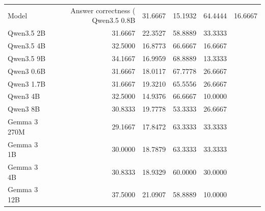 \begin{tabular}{lrrrr}
\toprule
Model & Answer correctness (%
\midrule
Qwen3.5 0.8B & 31.6667 & 15.1932 & 64.4444 & 16.6667 \\
Qwen3.5 2B & 31.6667 & 22.3527 & 58.8889 & 33.3333 \\
Qwen3.5 4B & 32.5000 & 16.8773 & 66.6667 & 16.6667 \\
Qwen3.5 9B & 34.1667 & 16.9959 & 68.8889 & 13.3333 \\
Qwen3 0.6B & 31.6667 & 18.0117 & 67.7778 & 26.6667 \\
Qwen3 1.7B & 31.6667 & 19.3210 & 65.5556 & 26.6667 \\
Qwen3 4B & 32.5000 & 14.9376 & 66.6667 & 10.0000 \\
Qwen3 8B & 30.8333 & 19.7778 & 53.3333 & 26.6667 \\
Gemma 3 270M & 29.1667 & 17.8472 & 63.3333 & 33.3333 \\
Gemma 3 1B & 30.0000 & 18.7879 & 63.3333 & 33.3333 \\
Gemma 3 4B & 30.8333 & 18.9329 & 60.0000 & 30.0000 \\
Gemma 3 12B & 37.5000 & 21.0907 & 58.8889 & 10.0000 \\
\bottomrule
\end{tabular}
